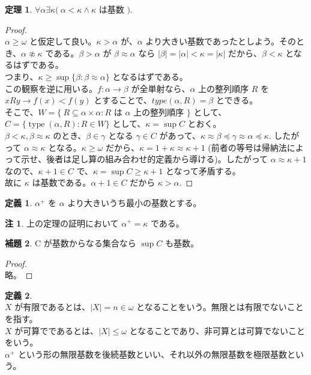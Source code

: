 \documentclass{jsarticle}
\theoremstyle{definition}
\newtheorem*{definition*}{定義}
\newtheorem{theorem}{定理}[section]
\newtheorem{lemma}[theorem]{補題}
\newtheorem{remark}{注}[section]
\begin{document}
    \begin{theorem}
        $\forall \alpha \exists \kappa (\ \alpha < \kappa \land \kappa$ は基数 $).$
    \end{theorem}
    \begin{proof} \ \\
        $\alpha\geq\omega$ と仮定して良い。$\kappa > \alpha$ が、$\alpha$ より大きい基数であったとしよう。そのとき、$\alpha \not\approx \kappa$ である。$\beta > \alpha$ が $\beta \approx \alpha$ なら $|\beta| = |\alpha| < \kappa = |\kappa|$ だから、$\beta < \kappa$ となるはずである。\\
        つまり、$\kappa \geq \sup \{\beta : \beta \approx \alpha\}$ となるはずである。\\
        この観察を逆に用いる。$f : \alpha \rightarrow \beta$ が全単射なら、$\alpha$ 上の整列順序 $R$ を $xRy \rightarrow f(x) < f(y)$ とすることで、$type(\alpha, R) = \beta$ とできる。\\
        そこで、$W = \{\ R \subseteq \alpha \times \alpha : R$ は $\alpha$ 上の整列順序 $\}$ として、$C = \{\operatorname{type}(\alpha, R) : R \in W\}$ として、$\kappa = \sup C$ とおく。\\
        $\beta < \kappa, \beta \approx \kappa$ のとき、$\beta \in \gamma$ となる $\gamma \in C$ があって、$\kappa \approx \beta \preceq \gamma \approx \alpha \preceq \kappa.$ したがって $\alpha \approx \kappa$ となる。$\kappa \geq \omega$ だから、$\kappa = 1 + \kappa \approx \kappa + 1$ (前者の等号は帰納法によって示せ、後者は足し算の組み合わせ的定義から導ける)。したがって $\alpha \approx \kappa+1$ なので、$\kappa+1 \in C$ で、$\kappa = \sup C \geq \kappa + 1$ となって矛盾する。\\
        故に $\kappa$ は基数である。$\alpha + 1 \in C$ だから $\kappa > \alpha.$
    \end{proof}
    \begin{definition*}
        $\alpha^+$ を $\alpha$ より大きいうち最小の基数とする。
    \end{definition*}
    \begin{remark}
        上の定理の証明において $\alpha^+ = \kappa$ である。
    \end{remark}
    \vspace{1ex}
    \begin{lemma}
        C が基数からなる集合なら $\sup C$ も基数。
    \end{lemma}
    \begin{proof} \ \\
        略。
    \end{proof}
    \begin{definition*} \ \\
        $X$ が有限であるとは、$|X| = n \in \omega$ となることをいう。無限とは有限でないことを指す。\\
        $X$ が可算でであるとは、$|X| \leq \omega$ となることであり、非可算とは可算でないことをいう。\\
        $\alpha^+$ という形の無限基数を後続基数といい、それ以外の無限基数を極限基数という。
    \end{definition*}
\end{document}
